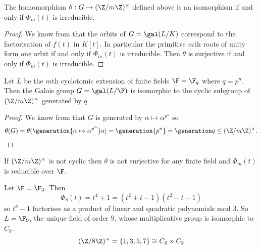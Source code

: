 \documentclass[a4paper]{article}
\begin{document}
\begin{lemma}
  The homomorphism \(\theta: G \to (\Z/m\Z)^\times\) defined above is an isomorphism if and only if \(\Phi_m(t)\) is irreducible.
\end{lemma}

\begin{proof}
  We know from  that the orbits of \(G = \gal(L/K)\) correspond to the factorisation of \(f(t)\) in \(K[t]\). In particular the primitive \(m\)th roots of unity form one orbit if and only if \(\Phi_m(t)\) is irreducible. Then \(\theta\) is surjective if and only if \(\Phi_m(t)\) is irreducible.
\end{proof}

\begin{theorem}
  Let \(L\) be the \(m\)th cyclotomic extension of finite fields \(\F = \F_q\) where \(q = p^n\). Then the Galois group \(G = \gal(L/\F)\) is isomorphic to the cyclic subgroup of \((\Z/m\Z)^\times\) generated by \(q\).
\end{theorem}

\begin{proof}
  We know from  that \(G\) is generated by \(\alpha \mapsto \alpha^{p^n}\) so
  \[
    \theta(G) = \theta(\generation{\alpha \mapsto \alpha^{p^n}}a) =  \generation{p^n} = \generation q \leq (\Z/m\Z)^\times.
  \]
\end{proof}

\begin{remark}
  If \((\Z/m\Z)^\times\) is not cyclic then \(\theta\) is not surjective for any finite field and \(\Phi_m(t)\) is reducible over \(\F\).
\end{remark}

\begin{eg}
  Let \(\F = \F_3\). Then
  \[
    \Phi_8(t) =  t^4 + 1 = (t^2 + t - 1)(t^2 - t - 1)
  \]
  so \(t^8 - 1\) factorises as a product of linear and quadratic polynomials mod \(3\). So \(L = \F_9\), the unique field of order \(9\), whose multiplicative group is isomorphic to \(C_8\).
  \[
    (\Z/8\Z)^\times = \{1, 3, 5, 7\} \cong C_2 \times C_2
  \]
\end{eg}
\end{document}
